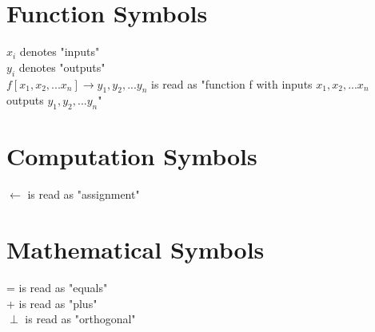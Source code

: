 \documentclass[11pt]{article}
\begin{document}
\section*{Function Symbols}
$x_i$ denotes "inputs"\\
$y_i$ denotes "outputs"\\
$f[x_1,x_2,...x_n] \rightarrow y_1, y_2,...y_n$ \hspace{1.5mm} is read as "function f with inputs $x_1,x_2,...x_n$ outputs $y_1,y_2,...y_n$"\\








\section*{Computation Symbols}
$\leftarrow$ is read as "assignment"\\








\section*{Mathematical Symbols}
= is read as "equals"\\
+ is read as "plus"\\
$\perp$ is read as "orthogonal"\\
\end{document}
